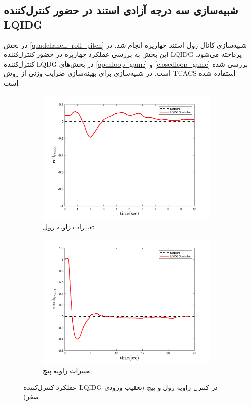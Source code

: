 \subsection{شبیه‌سازی سه درجه آزادی استند در حضور کنترل‌کننده LQIDG}\label{roll_pitch_lqidg_section}
در بخش
\ref{quadchanell_roll_pitch}
شبیه‌سازی کانال رول استند چهارپره انجام شد. در این بخش به بررسی عملکرد چهارپره در حضور کنترل‌کننده LQIDG پرداخته می‌شود. کنترل‌کننده LQDG در بخش‌های
\ref{openloop_game}
و
\ref{closedloop_game}
بررسی شده است.
 در شبیه‌سازی برای بهینه‌سازی ضرایب وزنی از روش
TCACS \cite{Karimi2010}
استفاده شده است.
\begin{figure}
	\centering
	\begin{subfigure}
		\centering
		\includegraphics[width=12cm]{../Figures/Calibration/LQIDG/3DOF/lqidg_roll.png}
		\caption{تغییرات زاویه رول}
	\end{subfigure}%
	\begin{subfigure}
		\centering
		\includegraphics[width=12cm]{../Figures/Calibration/LQIDG/3DOF/lqidg_pitch.png}
		\caption{تغییرات زاویه پیچ}
	\end{subfigure}
	\caption{‫‪عملکرد کنترل‌کننده LQIDG در کنترل زاویه رول و پیچ (تعقیب ورودی صفر)}
\end{figure}


